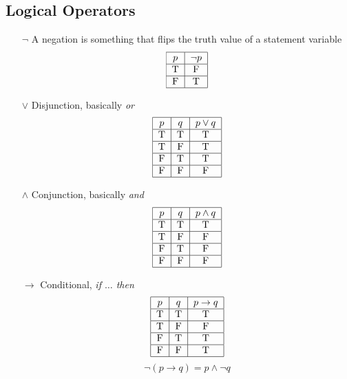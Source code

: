 \documentclass[12pt]{book}
\begin{document}
\subsection{Logical Operators}
\begin{enumerate}
    \item[$\neg$] A negation is something that flips the truth value of a statement variable
    \[
    \begin{tabular}{|c|c|}
        \hline
        $p$ & $\neg p$\\
        \hline
        T&F\\
        \hline
        F&T\\
        \hline
    \end{tabular}
    \]

    \item[$\vee$] Disjunction, basically \textit{or}
    \[
    \begin{tabular}{|c|c|c|}
        \hline
        $p$ & $q$ & $p \vee q$\\
        \hline
        T&T&T\\
        \hline
        T&F&T\\
        \hline
        F&T&T\\
        \hline
        F&F&F\\
        \hline
    \end{tabular}
    \]
    
    \item[$\wedge$] Conjunction, basically \textit{and}
    \[
    \begin{tabular}{|c|c|c|}
        \hline
        $p$ & $q$ & $p \wedge q$\\
        \hline
        T&T&T\\
        \hline
        T&F&F\\
        \hline
        F&T&F\\
        \hline
        F&F&F\\
        \hline
    \end{tabular}
    \]
    
    \item[$\rightarrow$] Conditional, \textit{if $\ldots$ then}\\
    \[
    \begin{tabular}{|c|c|c|}
        \hline
        $p$ & $q$ & $p \rightarrow q$\\
        \hline
        T&T&T\\
        \hline
        T&F&F\\
        \hline
        F&T&T\\
        \hline
        F&F&T\\
        \hline
    \end{tabular}
    \]
    \[
    \neg ( p \rightarrow q ) =  p \wedge \neg q
    \]


\end{enumerate}
\end{document}
